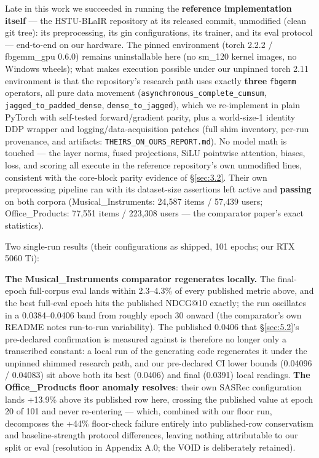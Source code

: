 Late in this work we succeeded in running the \textbf{reference implementation itself} --- the HSTU-BLaIR repository at its released commit, unmodified (clean git tree): its preprocessing, its gin configurations, its trainer, and its eval protocol --- end-to-end on our hardware. The pinned environment (torch 2.2.2 / fbgemm\_gpu 0.6.0) remains uninstallable here (no sm\_120 kernel images, no Windows wheels); what makes execution possible under our unpinned torch 2.11 environment is that the repository's research path uses exactly \textbf{three} \texttt{fbgemm} operators, all pure data movement (\texttt{asynchronous\_complete\_cumsum}, \texttt{jagged\_to\_padded\_dense}, \texttt{dense\_to\_jagged}), which we re-implement in plain PyTorch with self-tested forward/gradient parity, plus a world-size-1 identity DDP wrapper and logging/data-acquisition patches (full shim inventory, per-run provenance, and artifacts: \texttt{THEIRS\_ON\_OURS\_REPORT.md}). No model math is touched --- the layer norms, fused projections, SiLU pointwise attention, biases, loss, and scoring all execute in the reference repository's own unmodified lines, consistent with the core-block parity evidence of \S\ref{sec:3.2}. Their own preprocessing pipeline ran with its dataset-size assertions left active and \textbf{passing} on both corpora (Musical\_Instruments: 24,587 items / 57,439 users; Office\_Products: 77,551 items / 223,308 users --- the comparator paper's exact statistics).

Two single-run results (their configurations as shipped, 101 epochs; our RTX 5060 Ti):



\textbf{The Musical\_Instruments comparator regenerates locally.} The final-epoch full-corpus eval lands within 2.3--4.3\% of every published metric above, and the best full-eval epoch hits the published NDCG@10 exactly; the run oscillates in a 0.0384--0.0406 band from roughly epoch 30 onward (the comparator's own README notes run-to-run variability). The published 0.0406 that \S\ref{sec:5.2}'s pre-declared confirmation is measured against is therefore no longer only a transcribed constant: a local run of the generating code regenerates it under the unpinned shimmed research path, and our pre-declared CI lower bounds (0.04096 / 0.04083) sit above both its best (0.0406) and final (0.0391) local readings. \textbf{The Office\_Products floor anomaly resolves}: their own SASRec configuration lands +13.9\% above its published row here, crossing the published value at epoch 20 of 101 and never re-entering --- which, combined with our floor run, decomposes the +44\% floor-check failure entirely into published-row conservatism and baseline-strength protocol differences, leaving nothing attributable to our split or eval (resolution in Appendix A.0; the VOID is deliberately retained).

